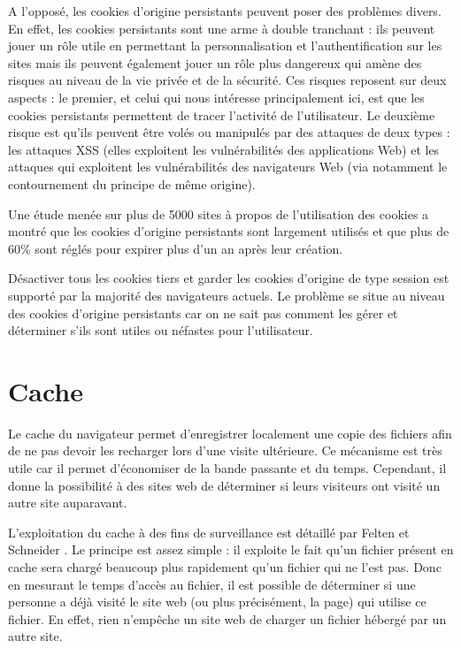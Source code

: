 A l'opposé, les cookies d'origine persistants peuvent poser des problèmes divers. En effet, les cookies persistants sont une arme à double tranchant : ils peuvent jouer un rôle utile en permettant la personnalisation et l'authentification sur les sites mais ils peuvent également jouer un rôle plus dangereux qui amène des risques au niveau de la vie privée et de la sécurité. Ces risques reposent sur deux aspects : le premier, et celui qui nous intéresse principalement ici, est que les cookies persistants permettent de tracer l'activité de l'utilisateur. Le deuxième risque est qu'ils peuvent être volés ou manipulés par des attaques de deux types : les attaques XSS (elles exploitent les vulnérabilités des applications Web) et les attaques qui exploitent les vulnérabilités des navigateurs Web (via notamment le contournement du principe de même origine).
\newline

Une étude menée sur plus de 5000 sites à propos de l'utilisation des cookies \cite{Yue:2007:ACU:1251984.1253093} a montré que les cookies d'origine persistants sont largement utilisés et que plus de 60\% sont réglés pour expirer plus d'un an après leur création.
\newline

Désactiver tous les cookies tiers et garder les cookies d'origine de type session est supporté par la majorité des navigateurs actuels. Le problème se situe au niveau des cookies d'origine persistants car on ne sait pas comment les gérer et déterminer s'ils sont utiles ou néfastes pour l'utilisateur.


\section{Cache}
\label{cache}
Le cache du navigateur permet d'enregistrer localement une copie des fichiers afin de ne pas devoir les recharger lors d'une visite ultérieure. Ce mécanisme est très utile car il permet d'économiser de la bande passante et du temps. Cependant, il donne la possibilité à des sites web de déterminer si leurs visiteurs ont visité un autre site auparavant.

L'exploitation du cache à des fins de surveillance est détaillé par Felten et Schneider \cite{Felten:2000:TAW:352600.352606}.
Le principe est assez simple : il exploite le fait qu'un fichier présent en cache sera chargé beaucoup plus rapidement qu'un fichier qui ne l'est pas. Donc en mesurant le temps d'accès au fichier, il est possible de déterminer si une personne a déjà visité le site web (ou plus précisément, la page) qui utilise ce fichier. En effet, rien n'empêche un site web de charger un fichier hébergé par un autre site.
\newline

